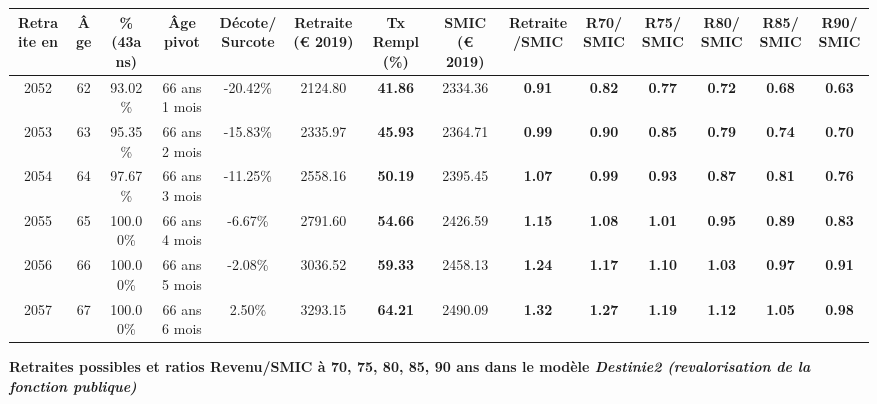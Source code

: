 \begin{adjustbox}{max width=\textwidth} 
\begin{tabular}[htb]{|c|c||c|c|c||c|c||c|c||c|c|c|c|c|} 
\hline 
 Retraite en &  Âge &  \%(43ans) &  Âge pivot &  Décote/Surcote &  Retraite (\euro{} 2019) &  Tx Rempl(\%) &  SMIC (\euro{} 2019) &  Retraite/SMIC &  R70/SMIC &  R75/SMIC &  R80/SMIC &  R85/SMIC &  R90/SMIC \\ 
\hline \hline 
 2052 &  62 &  93.02\% &  66 ans 1 mois &  -20.42\% &  2124.80 &  {\bf 41.86} &  2334.36 &  {\bf {\color{red} 0.91}} &  {\bf {\color{red} 0.82}} &  {\bf {\color{red} 0.77}} &  {\bf {\color{red} 0.72}} &  {\bf {\color{red} 0.68}} &  {\bf {\color{red} 0.63}} \\ 
\hline 
 2053 &  63 &  95.35\% &  66 ans 2 mois &  -15.83\% &  2335.97 &  {\bf 45.93} &  2364.71 &  {\bf {\color{red} 0.99}} &  {\bf {\color{red} 0.90}} &  {\bf {\color{red} 0.85}} &  {\bf {\color{red} 0.79}} &  {\bf {\color{red} 0.74}} &  {\bf {\color{red} 0.70}} \\ 
\hline 
 2054 &  64 &  97.67\% &  66 ans 3 mois &  -11.25\% &  2558.16 &  {\bf 50.19} &  2395.45 &  {\bf 1.07} &  {\bf {\color{red} 0.99}} &  {\bf {\color{red} 0.93}} &  {\bf {\color{red} 0.87}} &  {\bf {\color{red} 0.81}} &  {\bf {\color{red} 0.76}} \\ 
\hline 
 2055 &  65 &  100.00\% &  66 ans 4 mois &  -6.67\% &  2791.60 &  {\bf 54.66} &  2426.59 &  {\bf 1.15} &  {\bf 1.08} &  {\bf 1.01} &  {\bf {\color{red} 0.95}} &  {\bf {\color{red} 0.89}} &  {\bf {\color{red} 0.83}} \\ 
\hline 
 2056 &  66 &  100.00\% &  66 ans 5 mois &  -2.08\% &  3036.52 &  {\bf 59.33} &  2458.13 &  {\bf 1.24} &  {\bf 1.17} &  {\bf 1.10} &  {\bf 1.03} &  {\bf {\color{red} 0.97}} &  {\bf {\color{red} 0.91}} \\ 
\hline 
 2057 &  67 &  100.00\% &  66 ans 6 mois &  2.50\% &  3293.15 &  {\bf 64.21} &  2490.09 &  {\bf 1.32} &  {\bf 1.27} &  {\bf 1.19} &  {\bf 1.12} &  {\bf 1.05} &  {\bf {\color{red} 0.98}} \\ 
\hline 
\hline 
\end{tabular} 
\end{adjustbox} 
 
 \vspace{0.1cm} 
{\bf \noindent Retraites possibles et ratios Revenu/SMIC à 70, 75, 80, 85, 90 ans dans le modèle \emph{Destinie2 (revalorisation de la fonction publique)}}  
 
